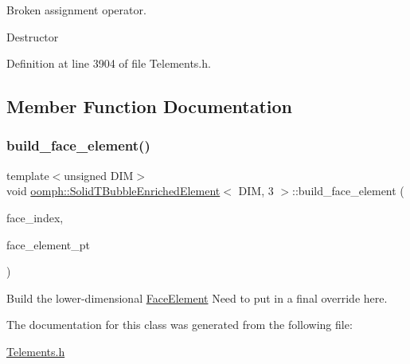 Broken assignment operator. 

Destructor 

Definition at line 3904 of file Telements.\+h.



\subsection{Member Function Documentation}
\mbox{\label{classoomph_1_1SolidTBubbleEnrichedElement_3_01DIM_00_013_01_4_a854529bd5bea023ac6a6d1cbae1a80c0}} 
\subsubsection{\texorpdfstring{build\+\_\+face\+\_\+element()}{build\_face\_element()}}
{\footnotesize\ttfamily template$<$unsigned D\+IM$>$ \\
void \hyperlink{classoomph_1_1SolidTBubbleEnrichedElement}{oomph\+::\+Solid\+T\+Bubble\+Enriched\+Element}$<$ D\+IM, 3 $>$\+::build\+\_\+face\+\_\+element (\begin{DoxyParamCaption}\item[{const int \&}]{face\+\_\+index,  }\item[{\hyperlink{classoomph_1_1FaceElement}{Face\+Element} $\ast$}]{face\+\_\+element\+\_\+pt }\end{DoxyParamCaption})}



Build the lower-\/dimensional \hyperlink{classoomph_1_1FaceElement}{Face\+Element} Need to put in a final override here. 



The documentation for this class was generated from the following file\+:\begin{DoxyCompactItemize}
\item 
\hyperlink{Telements_8h}{Telements.\+h}\end{DoxyCompactItemize}
